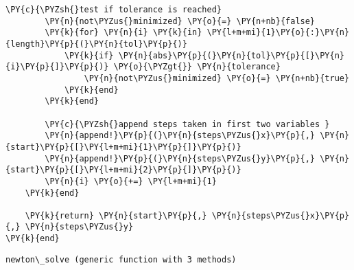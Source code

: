 \begin{tcolorbox}[breakable, size=fbox, boxrule=1pt, pad at break*=1mm,colback=cellbackground, colframe=cellborder]
\begin{Verbatim}[commandchars=\\\{\}]
        \PY{c}{\PYZsh{}test if tolerance is reached}
        \PY{n}{not\PYZus{}minimized} \PY{o}{=} \PY{n+nb}{false}
        \PY{k}{for} \PY{n}{i} \PY{k}{in} \PY{l+m+mi}{1}\PY{o}{:}\PY{n}{length}\PY{p}{(}\PY{n}{tol}\PY{p}{)}
            \PY{k}{if} \PY{n}{abs}\PY{p}{(}\PY{n}{tol}\PY{p}{[}\PY{n}{i}\PY{p}{]}\PY{p}{)} \PY{o}{\PYZgt{}} \PY{n}{tolerance}
                \PY{n}{not\PYZus{}minimized} \PY{o}{=} \PY{n+nb}{true}
            \PY{k}{end}
        \PY{k}{end}

        \PY{c}{\PYZsh{}append steps taken in first two variables }
        \PY{n}{append!}\PY{p}{(}\PY{n}{steps\PYZus{}x}\PY{p}{,} \PY{n}{start}\PY{p}{[}\PY{l+m+mi}{1}\PY{p}{]}\PY{p}{)}
        \PY{n}{append!}\PY{p}{(}\PY{n}{steps\PYZus{}y}\PY{p}{,} \PY{n}{start}\PY{p}{[}\PY{l+m+mi}{2}\PY{p}{]}\PY{p}{)}
        \PY{n}{i} \PY{o}{+=} \PY{l+m+mi}{1}
    \PY{k}{end}

    \PY{k}{return} \PY{n}{start}\PY{p}{,} \PY{n}{steps\PYZus{}x}\PY{p}{,} \PY{n}{steps\PYZus{}y}
\PY{k}{end}
\end{Verbatim}
\end{tcolorbox}

    
    \begin{Verbatim}[commandchars=\\\{\}]
newton\_solve (generic function with 3 methods)
    \end{Verbatim}